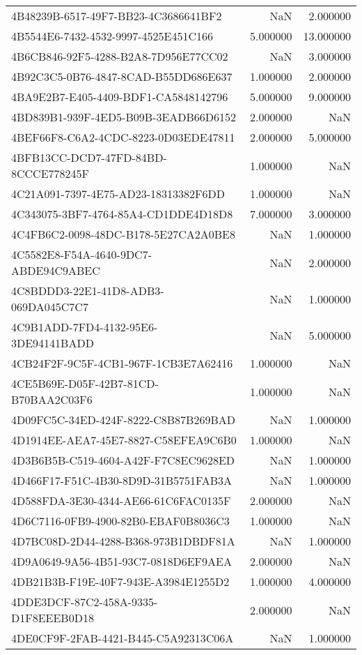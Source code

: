 \begin{tabular}{lrr}
4B48239B-6517-49F7-BB23-4C3686641BF2 & NaN & 2.000000 \\
4B5544E6-7432-4532-9997-4525E451C166 & 5.000000 & 13.000000 \\
4B6CB846-92F5-4288-B2A8-7D956E77CC02 & NaN & 3.000000 \\
4B92C3C5-0B76-4847-8CAD-B55DD686E637 & 1.000000 & 2.000000 \\
4BA9E2B7-E405-4409-BDF1-CA5848142796 & 5.000000 & 9.000000 \\
4BD839B1-939F-4ED5-B09B-3EADB66D6152 & 2.000000 & NaN \\
4BEF66F8-C6A2-4CDC-8223-0D03EDE47811 & 2.000000 & 5.000000 \\
4BFB13CC-DCD7-47FD-84BD-8CCCE778245F & 1.000000 & NaN \\
4C21A091-7397-4E75-AD23-18313382F6DD & 1.000000 & NaN \\
4C343075-3BF7-4764-85A4-CD1DDE4D18D8 & 7.000000 & 3.000000 \\
4C4FB6C2-0098-48DC-B178-5E27CA2A0BE8 & NaN & 1.000000 \\
4C5582E8-F54A-4640-9DC7-ABDE94C9ABEC & NaN & 2.000000 \\
4C8BDDD3-22E1-41D8-ADB3-069DA045C7C7 & NaN & 1.000000 \\
4C9B1ADD-7FD4-4132-95E6-3DE94141BADD & NaN & 5.000000 \\
4CB24F2F-9C5F-4CB1-967F-1CB3E7A62416 & 1.000000 & NaN \\
4CE5B69E-D05F-42B7-81CD-B70BAA2C03F6 & 1.000000 & NaN \\
4D09FC5C-34ED-424F-8222-C8B87B269BAD & NaN & 1.000000 \\
4D1914EE-AEA7-45E7-8827-C58EFEA9C6B0 & 1.000000 & NaN \\
4D3B6B5B-C519-4604-A42F-F7C8EC9628ED & NaN & 1.000000 \\
4D466F17-F51C-4B30-8D9D-31B5751FAB3A & NaN & 1.000000 \\
4D588FDA-3E30-4344-AE66-61C6FAC0135F & 2.000000 & NaN \\
4D6C7116-0FB9-4900-82B0-EBAF0B8036C3 & 1.000000 & NaN \\
4D7BC08D-2D44-4288-B368-973B1DBDF81A & NaN & 1.000000 \\
4D9A0649-9A56-4B51-93C7-0818D6EF9AEA & 2.000000 & NaN \\
4DB21B3B-F19E-40F7-943E-A3984E1255D2 & 1.000000 & 4.000000 \\
4DDE3DCF-87C2-458A-9335-D1F8EEEB0D18 & 2.000000 & NaN \\
4DE0CF9F-2FAB-4421-B445-C5A92313C06A & NaN & 1.000000 \\

\end{tabular}
